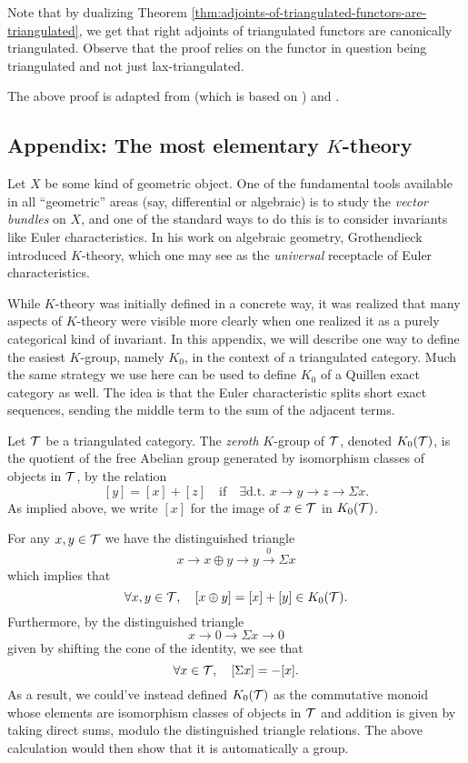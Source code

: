 \begin{remark}
	Note that by dualizing Theorem \ref{thm:adjoints-of-triangulated-functors-are-triangulated}, we get that right adjoints of triangulated functors are canonically triangulated.
	Observe that the proof relies on the functor in question being triangulated and not just lax-triangulated.
\end{remark}
\begin{remark}
	The above proof is adapted from \cite[Thm.\ 47]{murfet-triangulated-categories} (which is based on \cite[Lemma 5.3.6]{neeman-triangulated-categories}) and \cite{4984372}.
\end{remark}

\subsection{Appendix: The most elementary \(K\)-theory}
Let \(X\) be some kind of geometric object. One of the fundamental tools available in all ``geometric'' areas (say, differential or algebraic) is to study the
\emph{vector bundles} on \(X\), and one of the standard ways to do this is to consider invariants like Euler characteristics. In his work on algebraic geometry,
Grothendieck introduced \(K\)-theory, which one may see as the \emph{universal} receptacle of Euler characteristics.

While \(K\)-theory was initially defined in a concrete way, it was realized that many aspects of \(K\)-theory were visible more clearly when one realized it as
a purely categorical kind of invariant. In this appendix, we will describe one way to define the easiest \(K\)-group, namely \(K_0\), in the context of a triangulated
category. Much the same strategy we use here can be used to define \(K_0\) of a Quillen exact category as well. The idea is that the Euler characteristic splits short exact sequences,
sending the middle term to the sum of the adjacent terms.

\begin{definition}
	Let \(\mathcal{T}\) be a triangulated category. The \emph{zeroth} \(K\)-group of \(\mathcal{T}\), denoted \(K_0(\mathcal{T})\), is the quotient of the free Abelian group
	generated by isomorphism classes of objects in \(\mathcal{T}\), by the relation
	\[ [y] = [x] + [z] \quad\text{if}\quad \exists\text{d.t. } x\to y\to z \to \Sigma x.  \]
	As implied above, we write \([x]\) for the image of \(x\in\mathcal{T}\) in \(K_0(\mathcal{T})\).
\end{definition}
\begin{remark}
	For any \(x,y\in\mathcal{T}\) we have the distinguished triangle
	\[ x \to x\oplus y \to y \overset0\to \Sigma x \]
	which implies that
	\[ \forall x,y\in\mathcal{T},\quad [x\oplus y] = [x] + [y] \in K_0(\mathcal{T}). \]
	Furthermore, by the distinguished triangle
	\[ x \to 0 \to \Sigma x \to 0 \]
	given by shifting the cone of the identity, we see that
	\[ \forall x\in\mathcal{T},\quad [\Sigma x] = -[x]. \]
	As a result, we could've instead defined \(K_0(\mathcal{T})\) as the commutative monoid whose elements are isomorphism classes of objects in \(\mathcal{T}\) and addition
	is given by taking direct sums, modulo the distinguished triangle relations. The above calculation would then show that it is automatically a group.
\end{remark}

